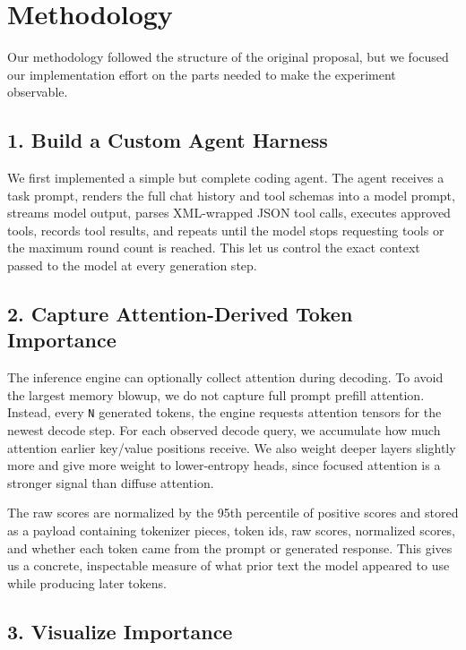 \documentclass[11pt]{article}
\begin{document}
\section*{Methodology}

Our methodology followed the structure of the original proposal, but we focused
our implementation effort on the parts needed to make the experiment observable.

\subsection*{1. Build a Custom Agent Harness}

We first implemented a simple but complete coding agent. The agent receives a
task prompt, renders the full chat history and tool schemas into a model prompt,
streams model output, parses XML-wrapped JSON tool calls, executes approved
tools, records tool results, and repeats until the model stops requesting tools
or the maximum round count is reached. This let us control the exact context
passed to the model at every generation step.

\subsection*{2. Capture Attention-Derived Token Importance}

The inference engine can optionally collect attention during decoding. To avoid
the largest memory blowup, we do not capture full prompt prefill attention.
Instead, every \texttt{N} generated tokens, the engine requests attention tensors
for the newest decode step. For each observed decode query, we accumulate how
much attention earlier key/value positions receive. We also weight deeper layers
slightly more and give more weight to lower-entropy heads, since focused
attention is a stronger signal than diffuse attention.

The raw scores are normalized by the 95th percentile of positive scores and
stored as a payload containing tokenizer pieces, token ids, raw scores,
normalized scores, and whether each token came from the prompt or generated
response. This gives us a concrete, inspectable measure of what prior text the
model appeared to use while producing later tokens.

\subsection*{3. Visualize Importance}
\end{document}
